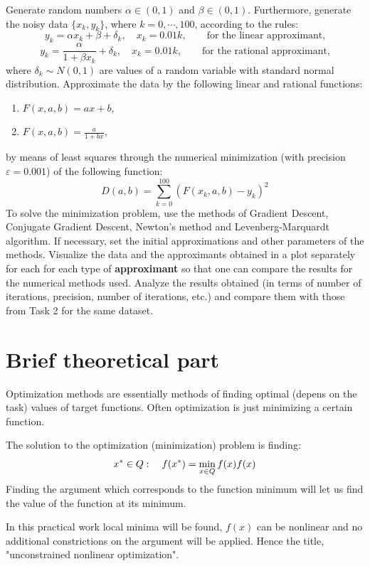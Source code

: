 \documentclass[12pt, a4paper]{article}
\begin{document}
Generate random numbers $\alpha \in (0, 1)$ and $\beta \in (0, 1)$. Furthermore, generate the noisy data $\{ x_k, y_k \}$, where $k = 0, \cdots, 100$, according to the rules:
\[ y_k = \alpha x_k + \beta + \delta_k, \quad x_k = 0.01 k, \qquad \text{for the linear approximant,} \]
\[ y_k = \frac{\alpha}{1+ \beta x_k} + \delta_k, \quad x_k = 0.01 k, \qquad \text{for the rational approximant,} \]
where $\delta_k \sim N(0, 1)$ are values of a random variable with standard normal distribution. Approximate the data by the following linear and rational functions:
\begin{enumerate}
	\item $F(x, a, b) = ax + b$,
	\item $F(x, a, b) = \frac{a}{1+bx}$,
\end{enumerate}
by means of least squares through the numerical minimization (with precision $\varepsilon = 0.001$) of the following function:
\[ D(a, b) = \sum_{k=0}^{100} \left( F(x_k, a, b) - y_k \right)^2 \]
To solve the minimization problem, use the methods of Gradient Descent, Conjugate Gradient Descent, Newton's method and Levenberg-Marquardt algorithm. If necessary, set the initial approximations and other parameters of the methods. Visualize the data and the approximants obtained in a plot separately for each for each type of \textbf{approximant} so that one can compare the results for the numerical methods used. Analyze the results obtained (in terms of number of iterations, precision, number of iterations, etc.) and compare them with those from Task 2 for the same dataset.

\newpage

\section*{Brief theoretical part}

Optimization methods are essentially methods of finding optimal (depens on the task) values of target functions. Often optimization is just minimizing a certain function.

The solution to the optimization (minimization) problem is finding:
\[ x^* \in Q: \quad f(x^*) = \min_{x\in Q} f(x) \def \arg \min_{x\in Q} f(x) \]
Finding the argument which corresponds to the function minimum will let us find the value of the function at its minimum.

In this practical work local minima will be found, $f(x)$ can be nonlinear and no additional constrictions on the argument will be applied. Hence the title, "unconstrained nonlinear optimization".
\end{document}
